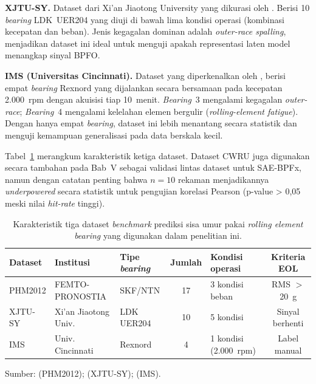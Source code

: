 \textbf{XJTU-SY.} Dataset dari Xi'an Jiaotong University yang dikurasi oleh
. Berisi 10 \emph{bearing} LDK~UER204 yang diuji di bawah
lima kondisi operasi (kombinasi kecepatan dan beban). Jenis kegagalan dominan
adalah \emph{outer-race spalling}, menjadikan dataset ini ideal untuk menguji
apakah representasi laten model menangkap sinyal BPFO.

\textbf{IMS (Universitas Cincinnati).} Dataset yang diperkenalkan oleh
, berisi empat \emph{bearing} Rexnord yang
dijalankan secara bersamaan pada kecepatan 2.000~rpm dengan akuisisi tiap
10~menit. \emph{Bearing}~3 mengalami kegagalan \emph{outer-race}; \emph{Bearing}~4
mengalami kelelahan elemen bergulir (\emph{rolling-element fatigue}).
Dengan hanya empat \emph{bearing}, dataset ini lebih menantang secara statistik
dan menguji kemampuan generalisasi pada data berskala kecil.

Tabel~\ref{tab:bab2_dataset_rul} merangkum karakteristik ketiga dataset.
Dataset CWRU juga digunakan secara tambahan pada Bab~V sebagai validasi
lintas dataset untuk SAE-BPFx, namun dengan catatan penting bahwa $n=10$
rekaman menjadikannya \emph{underpowered} secara statistik untuk pengujian
korelasi Pearson (p-value > 0,05 meski nilai \emph{hit-rate} tinggi).

\begin{table}[ht]
  \centering
  \caption{Karakteristik tiga dataset \emph{benchmark} prediksi sisa umur
           pakai \emph{rolling element bearing} yang digunakan dalam penelitian ini.}
  \label{tab:bab2_dataset_rul}
  \footnotesize
  \begin{tabularx}{\textwidth}{@{}l l l c l c@{}}
    \toprule
    \textbf{Dataset} & \textbf{Institusi} & \textbf{Tipe \emph{bearing}}
      & \textbf{Jumlah} & \textbf{Kondisi operasi} & \textbf{Kriteria EOL} \\
    \midrule
    PHM2012 & FEMTO-PRONOSTIA & SKF/NTN & 17 & 3 kondisi beban & RMS $>$ 20~g \\
    XJTU-SY & Xi'an Jiaotong Univ. & LDK UER204 & 10 & 5 kondisi & Sinyal berhenti \\
    IMS     & Univ. Cincinnati & Rexnord & 4  & 1 kondisi (2.000~rpm) & Label manual \\
    \bottomrule
  \end{tabularx}

  \smallskip
  {\footnotesize Sumber:  (PHM2012);
    (XJTU-SY); 
   (IMS).}
\end{table}

